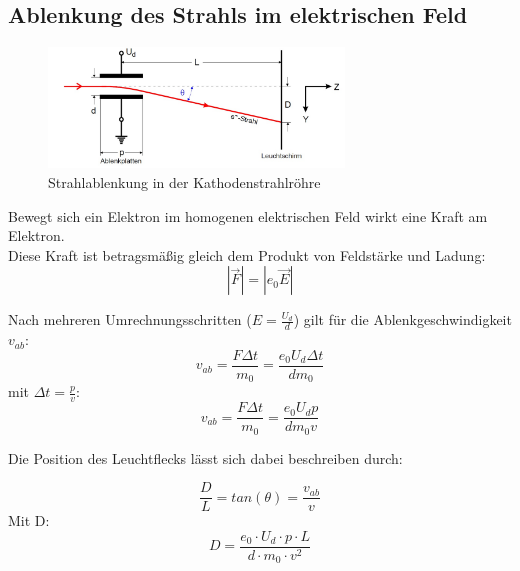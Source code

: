 \subsection{Ablenkung des Strahls im elektrischen Feld}
\begin{figure}[h]
  \centering
  \includegraphics[width=0.7\textwidth]{Grafiken/V501(2)_Abb1.jpg}
  \caption{Strahlablenkung in der Kathodenstrahlröhre}
\end{figure}
Bewegt sich ein Elektron im homogenen elektrischen Feld wirkt eine Kraft am Elektron. \\
Diese Kraft ist betragsmäßig gleich dem Produkt von Feldstärke und
Ladung:
\begin{equation}
  \label{eq:force}
  |\vec{F}| = |e_0\vec{E}|
\end{equation}

Nach mehreren Umrechnungsschritten ($E = \frac{U_d}{d}$) gilt für die Ablenkgeschwindigkeit $v_{ab}$:
\begin{equation}
  v_{ab} = \frac{F\Delta t}{m_0} = \frac{e_0 U_d\Delta t}{d m_0}
\end{equation}
mit $\Delta t =\frac{p}{v}$:
\begin{equation}
	v_{ab} = \frac{F\Delta t}{m_0} = \frac{e_0 U_d p}{d m_0 v}
\end{equation}

Die Position des Leuchtflecks lässt sich dabei beschreiben durch:

\begin{equation}
	\frac{D}{L} = tan(\theta) =  \frac{v_{ab}}{v}
\end{equation}
Mit D:
\begin{equation}
	D = \frac{e_0\cdot U_d\cdot p\cdot L}{d\cdot m_0\cdot v^2}
\end{equation}


